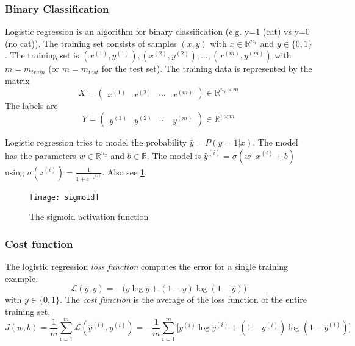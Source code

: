 \documentclass{article}
\begin{document}
\subsubsection{Binary Classification}
Logistic regression is an algorithm for binary classification (e.g. y=1 (cat) vs y=0 (no cat)).
The training set consists of samples $(x,y)$ with $x\in\mathbb{R}^{n_x}$ and $y\in\{0,1\}$.
The training set is $(x^{(1)},y^{(1)}), (x^{(2)},y^{(2)}), \ldots, (x^{(m)},y^{(m)})$ with $m=m_{train}$ (or $m=m_{test}$ for the test set).
The training data is represented by the matrix
\begin{equation}
  X=\begin{pmatrix}x^{(1)} & x^{(2)} & \cdots & x^{(m)}\end{pmatrix}\in\mathbb{R}^{n_x\times m}
\end{equation}
The labels are
\begin{equation}
  Y=\begin{pmatrix}y^{(1)} & y^{(2)} & \cdots & y^{(m)}\end{pmatrix}\in\mathbb{R}^{1\times m}
\end{equation}

Logistic regression tries to model the probability $\hat{y}=P(y=1|x)$.
The model has the parameters $w\in\mathbb{R}^{n_x}$ and $b\in\mathbb{R}$.
The model is $\hat{y}^{(i)}=\sigma(w^\top x^{(i)}+b)$ using $\sigma(z^{(i)})=\frac{1}{1+e^{-z^{(i)}}}$.
Also see \cref{fig:sigmoid}.
\begin{figure}[htbp]
  \begin{center}
    \texttt{[image: sigmoid]}
    \caption{The sigmoid activation function}
    \label{fig:sigmoid}
  \end{center}
\end{figure}

\subsubsection{Cost function}
The logistic regression \emph{loss function} computes the error for a single training example.
\begin{equation}
  \mathcal{L}(\hat{y},y)=-\big(y\log\hat{y}+(1-y)\log(1-\hat{y})\big)
\end{equation}
with $y\in\{0,1\}$.
The \emph{cost function} is the average of the loss function of the entire training set.
\begin{equation}
  J(w,b)=\frac{1}{m}\sum_{i=1}^m\mathcal{L}(\hat{y}^{(i)},y^{(i)})=
  -\frac{1}{m}\sum_{i=1}^m\big[y^{(i)}\log\hat{y}^{(i)}+(1-y^{(i)})\log(1-\hat{y}^{(i)})\big]
\end{equation}
\end{document}
